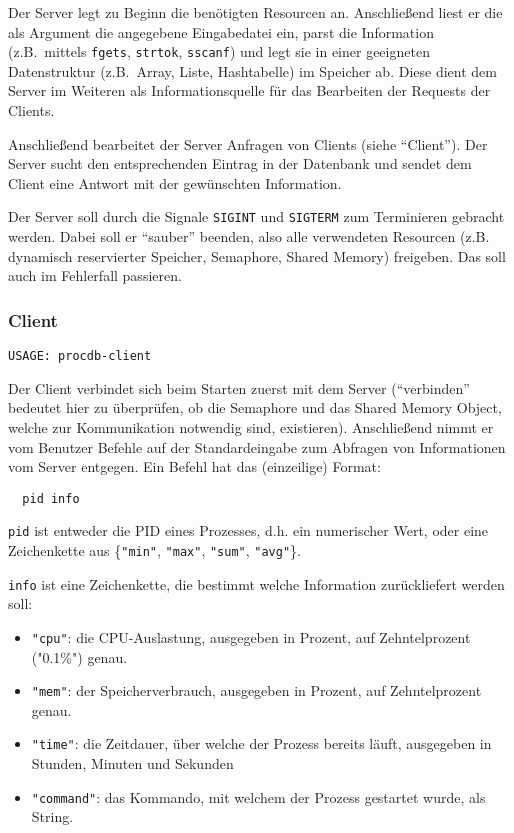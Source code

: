 Der Server legt zu Beginn die benötigten Resourcen an. Anschließend liest er
die als Argument die angegebene Eingabedatei ein, parst die Information (z.B.\
mittels \texttt{fgets}, \texttt{strtok}, \texttt{sscanf}) und legt sie in einer
geeigneten Datenstruktur (z.B.\ Array, Liste, Hashtabelle) im Speicher ab.
Diese dient dem Server im Weiteren als Informationsquelle für das Bearbeiten
der Requests der Clients.

Anschließend bearbeitet der Server Anfragen von Clients (siehe "`Client"'). Der
Server sucht den entsprechenden Eintrag in der Datenbank und sendet dem Client
eine Antwort mit der gewünschten Information.



Der Server soll durch die Signale \texttt{SIGINT} und \texttt{SIGTERM} zum
Terminieren gebracht werden. Dabei soll er "`sauber"' beenden, also alle
verwendeten Resourcen (z.B. dynamisch reservierter Speicher, Semaphore, Shared
Memory) freigeben. Das soll auch im Fehlerfall passieren.


\subsubsection*{Client}
\begin{verbatim}
USAGE: procdb-client
\end{verbatim}


Der Client verbindet sich beim Starten zuerst mit dem Server ("`verbinden"'
bedeutet hier zu überprüfen, ob die Semaphore und das Shared Memory Object,
welche zur Kommunikation notwendig sind, existieren). Anschließend nimmt er vom
Benutzer Befehle auf der Standardeingabe zum Abfragen von Informationen vom
Server entgegen. Ein Befehl hat das (einzeilige) Format:

\begin{verbatim}
  pid info
\end{verbatim}

\texttt{pid} ist entweder die PID eines Prozesses, d.h. ein numerischer Wert,
oder eine Zeichenkette aus \{\texttt{"{}min"}, \texttt{"{}max"},
\texttt{"{}sum"}, \texttt{"{}avg"}\}.

\texttt{info} ist eine Zeichenkette, die bestimmt welche Information
zurückliefert werden soll:

\begin{itemize}
  \item \texttt{"{}cpu"{}}: die CPU-Auslastung, ausgegeben in Prozent, auf
    Zehntelprozent ("{}0.1\%"{}) genau.
  \item \texttt{"{}mem"{}}: der Speicherverbrauch, ausgegeben in Prozent, auf
    Zehntelprozent genau.
  \item \texttt{"{}time"{}}: die Zeitdauer, über welche der Prozess bereits
    läuft, ausgegeben in Stunden, Minuten und Sekunden
  \item \texttt{"{}command"{}}: das Kommando, mit welchem der Prozess
    gestartet wurde, als String.
\end{itemize}


